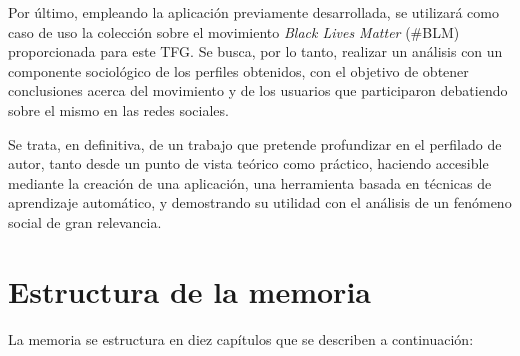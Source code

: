 \bigskip
Por último, empleando la aplicación previamente desarrollada, se utilizará como caso de uso la colección sobre el movimiento
\textit{Black Lives Matter} (\#BLM) proporcionada para este TFG. Se busca, por lo tanto, realizar un análisis con un componente sociológico
de los perfiles obtenidos,
con el objetivo de obtener conclusiones acerca del movimiento y de los usuarios que participaron debatiendo sobre el mismo en las redes sociales.

\bigskip
Se trata, en definitiva, de un trabajo que pretende profundizar en el perfilado de autor, tanto desde un punto de vista teórico como práctico,
haciendo accesible mediante la creación de una aplicación, una herramienta basada en técnicas de aprendizaje automático, y
demostrando su utilidad con el análisis de un fenómeno social de gran relevancia.

\section{Estructura de la memoria}
\label{sec:intro_estructura}

La memoria se estructura en diez capítulos que se describen a continuación:

